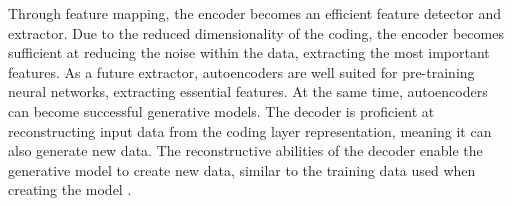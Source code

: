     Through feature mapping, the encoder becomes an efficient feature detector and extractor.
    Due to the reduced dimensionality of the coding, the encoder becomes sufficient at reducing the noise within the data, extracting the most important features.
    As a future extractor, autoencoders are well suited for pre-training neural networks, extracting essential features.
    At the same time, autoencoders can become successful generative models.
    The decoder is proficient at reconstructing input data from the coding layer representation, meaning it can also generate new data.
    The reconstructive abilities of the decoder enable the generative model to create new data, similar to the training data used when creating the model
    \cite[p.~506-508]{Geron2017}.

\fi